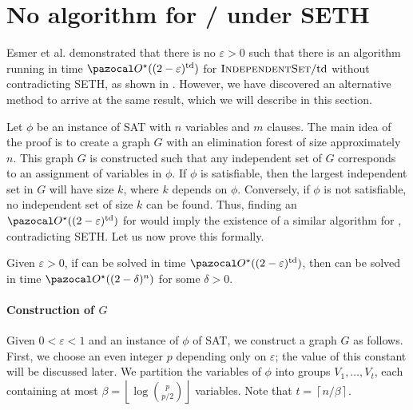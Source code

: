 \section{No algorithm for /\td{} under SETH}
\label{section:indset-td}

Esmer et al. \cite{esmer2024fundamental} demonstrated that there is no $\varepsilon > 0$ such that there is an algorithm running in time $\O^\star((2 - \varepsilon)^\td)$ for $\textsc{IndependentSet}/\text{td}$ without contradicting SETH, as shown in . However, we have discovered an alternative method to arrive at the same result, which we will describe in this section.

\medskip

Let $\phi$ be an instance of SAT with $n$ variables and $m$ clauses. The main idea of the proof is to create a graph $G$ with an elimination forest of size approximately $n$. This graph $G$ is constructed such that any independent set of $G$ corresponds to an assignment of variables in $\phi$. If $\phi$ is satisfiable, then the largest independent set in $G$ will have size $k$, where $k$ depends on $\phi$. Conversely, if $\phi$ is not satisfiable, no independent set of size $k$ can be found. Thus, finding an $\O^\star((2 - \varepsilon)^\td)$ for  would imply the existence of a similar algorithm for , contradicting SETH. Let us now prove this formally.

\begin{theorem}
    \label{theorem:indset-td-lowerbound}
    Given $\varepsilon > 0$, if  can be solved in time $\O^\star((2-\varepsilon)^\td)$, then  can be solved in time $\O^\star((2 - \delta)^n)$ for some $\delta > 0$.
\end{theorem}

\paragraph*{Construction of $G$} Given $0 < \varepsilon < 1$ and an instance of $\phi$ of SAT, we construct a graph $G$ as follows. First, we choose an even integer $p$ depending only on $\varepsilon$; the value of this constant will be discussed later. We partition the variables of $\phi$ into groups $V_1, \dots, V_t$, each containing at most $\beta = \left\lfloor\log\binom{p}{p/2}\right\rfloor$ variables. Note that $t = \left\lceil n/\beta\right\rceil$.

\medskip


